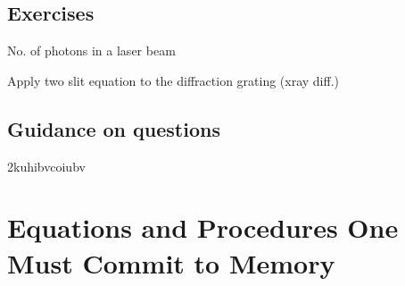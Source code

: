 \documentclass[colorlinks,11pt,a4paper,normalphoto,withhyper,ragged2e]{altareport}
\begin{document}
		
	\subsection{Exercises}
	
		\begin{todolist}[leftmargin=1cm]
			\item No. of photons in a laser beam
			\item Apply two slit equation to the diffraction grating (xray diff.)
		\end{todolist}
	
	
	
	
	
	
	\subsection{Guidance on questions}
	
		\begin{todolist}[leftmargin=1cm]
			\item 2kuhibvcoiubv
		\end{todolist}

	
	
	
	\pagebreak
	
	
	
	
\section{Equations and Procedures One Must Commit to Memory}
	
	
	
	
	\pagebreak
	
	
\newpage
{}  %
\end{document}
